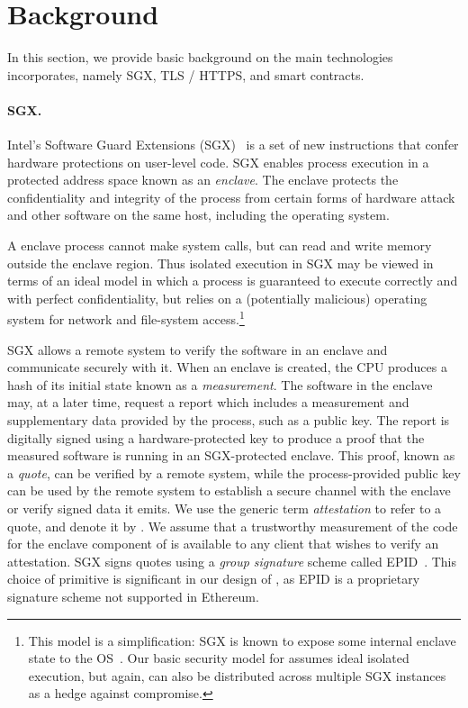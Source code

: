 \section{Background}
\label{sec:background}

In this section, we provide basic background on the main technologies \tc incorporates, namely SGX, TLS / HTTPS, and smart contracts.

\paragraph{\bf SGX.}
Intel's Software Guard Extensions (SGX)~
\cite{McKeen:2013jv,anati2013innovative,Phegade:2013km,sgxmanual}
is a set of new instructions that confer hardware protections on user-level code. SGX enables process execution in a protected address space known as an {\em enclave}.
The enclave protects the confidentiality and integrity of the process from certain forms of hardware attack and other software on the same host, including the operating system. 

A enclave process cannot make system calls, but can read and write memory outside the enclave region. Thus isolated execution in SGX may be viewed in terms of an ideal model in which a process is guaranteed to execute correctly and with perfect confidentiality, but relies on a (potentially malicious) operating system for network and file-system access.\footnote{This model is a simplification: SGX is known to expose some internal enclave state to the OS~\cite{sgxexplained}. Our basic security model for \tc assumes ideal isolated execution, but again, \tc can also be distributed across multiple SGX instances as a hedge against compromise.}

SGX allows a remote system to verify the software in an enclave and communicate securely with it. When an enclave is created, the CPU produces a hash of its initial state known as a {\em measurement}. The software in the enclave may, at a later time, request a report which includes a measurement and supplementary data provided by the process, such as a public key. The report is digitally signed using a hardware-protected key to produce a proof that the measured software is running in an SGX-protected enclave. This proof, known as a {\em quote}, can be verified by a remote system, while the process-provided public key can be used by the remote system to establish a secure channel with the enclave or verify signed data it emits. We use the generic term {\em attestation} to refer to a quote, and denote it by \att. We assume that a trustworthy measurement of the code for the enclave component of \tc is available to any client that wishes to verify an attestation. SGX signs quotes using a \emph{group signature} scheme called 
EPID~\cite{epid}. This choice of primitive is significant in our design of \tcs, as EPID is a proprietary signature scheme not supported in Ethereum.

